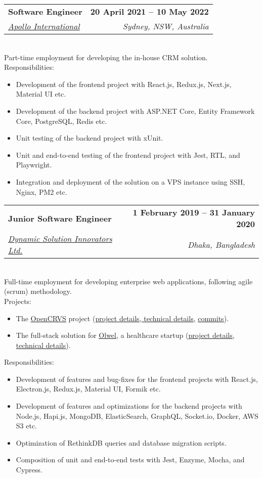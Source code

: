 \documentclass[12pt,a4paper]{article}
\makeatletter
\newcommand{\resumeItem}[1]{
  \item{
    {#1 \vspace{-2pt}}
  }
}
\newcommand{\resumeSubheading}[4]{
  \vspace{-2pt}\item
    \begin{tabular*}{1.0\textwidth}[t]{l@{\extracolsep{\fill}}r}
      \textbf{#1} & \textbf{\small #2} \\
      \textit{\small#3} & \textit{\small #4} \\
    \end{tabular*}\vspace{-7pt}
}
\newcommand{\resumeItemListStart}{\begin{itemize}}
\newcommand{\resumeItemListEnd}{\end{itemize}\vspace{-5pt}}
\makeatother
\begin{document}
    \resumeSubheading
      {Software Engineer}{20 April 2021 -- 10 May 2022}
      {\href{https://www.apollointl.com.au}{Apollo International}}{Sydney, NSW, Australia}
      \\ \vspace{8pt} Part-time employment for developing the in-house CRM solution. \vspace{-4pt}
      \\ \vspace{6pt} Responsibilities: \vspace{-6pt}
      \resumeItemListStart
        \resumeItem{Development of the frontend project with React.js, Redux.js,  Next.js, Material UI etc.}
        \resumeItem{Development of the backend project with ASP.NET Core, Entity Framework Core, PostgreSQL, Redis etc.}
        \resumeItem{Unit testing of the backend project with xUnit.}
        \resumeItem{Unit and end-to-end testing of the frontend project with Jest, RTL, and Playwright.}
        \resumeItem{Integration and deployment of the solution on a VPS instance using SSH, Nginx, PM2 etc.}
      \resumeItemListEnd

    \resumeSubheading
      {Junior Software Engineer}{1 February 2019 -- 31 January 2020}
      {\href{https://www.dsinnovators.com}{Dynamic Solution Innovators Ltd.}}{Dhaka, Bangladesh}
      \\ \vspace{8pt} Full-time employment for developing enterprise web applications, following agile (scrum) methodology. \vspace{-4pt}
      \\ \vspace{6pt}
      Projects: \vspace{-4pt}
      \resumeItemListStart
      \resumeItem{The \href{https://www.opencrvs.org}{\underline{OpenCRVS}} project (\href{https://www.dsinnovators.com/casestudies/open-crvs-2}{\href{https://www.dsinnovators.com/projects/open-crvs}{\underline{project details}}, \underline{technical details}}, \href{https://github.com/opencrvs/opencrvs-core/commits?author=maacpiash}{\underline{commits}}).}
      \resumeItem{The full-stack solution for \href{https://www.olwel.com}{\underline{Olwel}}, a healthcare startup (\href{https://www.dsinnovators.com/projects/olwel}{\underline{project details}}, \href{https://www.dsinnovators.com/casestudies/olwel-2}{\underline{technical details}}).}
      \resumeItemListEnd
      \vspace{-1pt}
      Responsibilities: \vspace{-6pt}
      \resumeItemListStart
        \resumeItem{Development of features and bug-fixes for the frontend projects with React.js, Electron.js, Redux.js, Material UI, Formik etc.}
        \resumeItem{Development of features and optimizations for the backend projects with Node.js, Hapi.js, MongoDB, ElasticSearch, GraphQL, Socket.io, Docker, AWS S3 etc.}
        \resumeItem{Optimization of RethinkDB queries and database migration scripts.}
        \resumeItem{Composition of unit and end-to-end tests with Jest, Enzyme, Mocha, and Cypress.}
    \resumeItemListEnd
\end{document}

